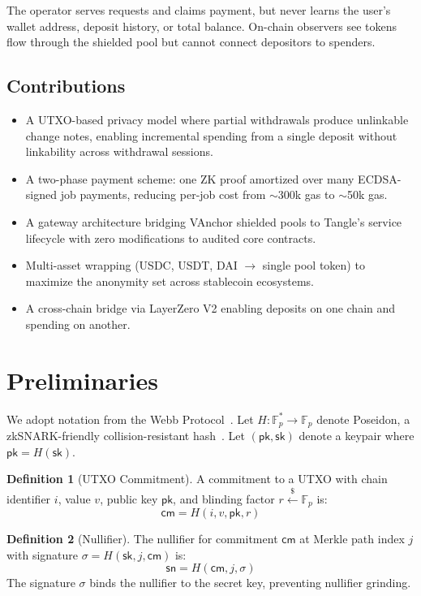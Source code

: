 \documentclass[11pt,a4paper]{article}
\theoremstyle{definition}
\newtheorem{definition}{Definition}
\begin{document}
The operator serves requests and claims payment, but never learns the user's wallet address, deposit history, or total balance. On-chain observers see tokens flow through the shielded pool but cannot connect depositors to spenders.

\subsection{Contributions}

\begin{itemize}[nosep]
  \item A UTXO-based privacy model where partial withdrawals produce unlinkable change notes, enabling incremental spending from a single deposit without linkability across withdrawal sessions.
  \item A two-phase payment scheme: one ZK proof amortized over many ECDSA-signed job payments, reducing per-job cost from $\sim$300k gas to $\sim$50k gas.
  \item A gateway architecture bridging VAnchor shielded pools to Tangle's service lifecycle with zero modifications to audited core contracts.
  \item Multi-asset wrapping (USDC, USDT, DAI $\to$ single pool token) to maximize the anonymity set across stablecoin ecosystems.
  \item A cross-chain bridge via LayerZero V2 enabling deposits on one chain and spending on another.
\end{itemize}

\section{Preliminaries}

We adopt notation from the Webb Protocol~\cite{webb}. Let $H : \mathbb{F}_p^* \to \mathbb{F}_p$ denote Poseidon, a zkSNARK-friendly collision-resistant hash~\cite{poseidon}. Let $(\mathsf{pk}, \mathsf{sk})$ denote a keypair where $\mathsf{pk} = H(\mathsf{sk})$.

\begin{definition}[UTXO Commitment]
A commitment to a UTXO with chain identifier $i$, value $v$, public key $\mathsf{pk}$, and blinding factor $r \xleftarrow{\$} \mathbb{F}_p$ is:
$$\mathsf{cm} = H(i, v, \mathsf{pk}, r)$$
\end{definition}

\begin{definition}[Nullifier]
The nullifier for commitment $\mathsf{cm}$ at Merkle path index $j$ with signature $\sigma = H(\mathsf{sk}, j, \mathsf{cm})$ is:
$$\mathsf{sn} = H(\mathsf{cm}, j, \sigma)$$
The signature $\sigma$ binds the nullifier to the secret key, preventing nullifier grinding.
\end{definition}
\end{document}

